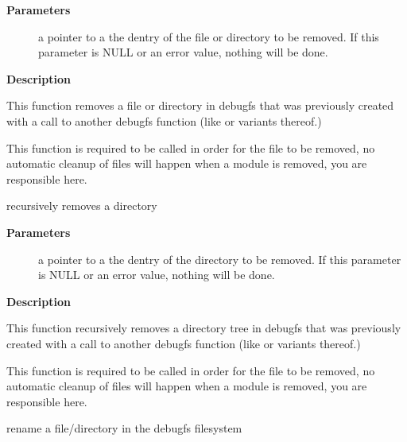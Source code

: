 \documentclass[a4paper,8pt,english]{sphinxmanual}
\begin{document}
\textbf{Parameters}
\begin{description}
\item[{}] \leavevmode
a pointer to a the dentry of the file or directory to be
removed.  If this parameter is NULL or an error value, nothing
will be done.

\end{description}

\textbf{Description}

This function removes a file or directory in debugfs that was previously
created with a call to another debugfs function (like
{\hyperref[filesystems/index:c.debugfs_create_file]{\emph{}}} or variants thereof.)

This function is required to be called in order for the file to be
removed, no automatic cleanup of files will happen when a module is
removed, you are responsible here.

\begin{fulllineitems}
\label{filesystems/index:c.debugfs_remove_recursive}
recursively removes a directory

\end{fulllineitems}


\textbf{Parameters}
\begin{description}
\item[{}] \leavevmode
a pointer to a the dentry of the directory to be removed.  If this
parameter is NULL or an error value, nothing will be done.

\end{description}

\textbf{Description}

This function recursively removes a directory tree in debugfs that
was previously created with a call to another debugfs function
(like {\hyperref[filesystems/index:c.debugfs_create_file]{\emph{}}} or variants thereof.)

This function is required to be called in order for the file to be
removed, no automatic cleanup of files will happen when a module is
removed, you are responsible here.

\begin{fulllineitems}
\label{filesystems/index:c.debugfs_rename}
rename a file/directory in the debugfs filesystem

\end{fulllineitems}
\end{document}
